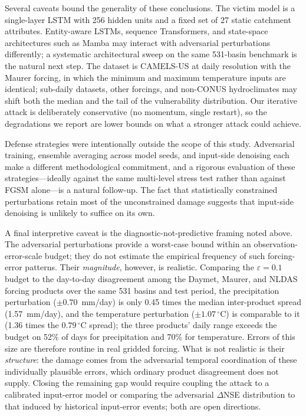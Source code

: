 \documentclass[final]{agujournal2019}
\begin{document}
Several caveats bound the generality of these conclusions. The victim model is a single-layer LSTM with 256 hidden units and a fixed set of 27 static catchment attributes. Entity-aware LSTMs, sequence Transformers, and state-space architectures such as Mamba may interact with adversarial perturbations differently; a systematic architectural sweep on the same 531-basin benchmark is the natural next step. The dataset is CAMELS-US at daily resolution with the Maurer forcing, in which the minimum and maximum temperature inputs are identical; sub-daily datasets, other forcings, and non-CONUS hydroclimates may shift both the median and the tail of the vulnerability distribution. Our iterative attack is deliberately conservative (no momentum, single restart), so the degradations we report are lower bounds on what a stronger attack could achieve.

Defense strategies were intentionally outside the scope of this study. Adversarial training, ensemble averaging across model seeds, and input-side denoising each make a different methodological commitment, and a rigorous evaluation of these strategies---ideally against the same multi-level stress test rather than against FGSM alone---is a natural follow-up. The fact that statistically constrained perturbations retain most of the unconstrained damage suggests that input-side denoising is unlikely to suffice on its own.

A final interpretive caveat is the diagnostic-not-predictive framing noted above. The adversarial perturbations provide a worst-case bound within an observation-error-scale budget; they do not estimate the empirical frequency of such forcing-error patterns. Their \emph{magnitude}, however, is realistic. Comparing the $\varepsilon = 0.1$ budget to the day-to-day disagreement among the Daymet, Maurer, and NLDAS forcing products over the same 531 basins and test period, the precipitation perturbation ($\pm 0.70$~mm/day) is only 0.45 times the median inter-product spread (1.57~mm/day), and the temperature perturbation ($\pm 1.07\,^\circ$C) is comparable to it (1.36 times the $0.79\,^\circ$C spread); the three products' daily range exceeds the budget on 52\% of days for precipitation and 70\% for temperature. Errors of this size are therefore routine in real gridded forcing. What is not realistic is their \emph{structure}: the damage comes from the adversarial temporal coordination of these individually plausible errors, which ordinary product disagreement does not supply. Closing the remaining gap would require coupling the attack to a calibrated input-error model or comparing the adversarial $\Delta$NSE distribution to that induced by historical input-error events; both are open directions.
\end{document}
